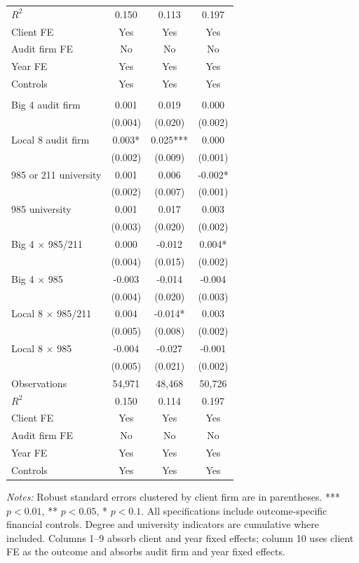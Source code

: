 \documentclass[10pt]{article}
\begin{document}
\begin{minipage}{19cm}
\begin{threeparttable}
\begin{tabular}{p{}ccc}
$R^{2}$ & 0.150 & 0.113 & 0.197 \\
Client FE & Yes & Yes & Yes \\
Audit firm FE & No & No & No \\
Year FE & Yes & Yes & Yes \\
Controls & Yes & Yes & Yes \\
\addlinespace
\multicolumn{4}{l}{\textbf{Panel B: Cumulative university tiers (base: neither 985 nor 211)}} \\
Big 4 audit firm & 0.001 & 0.019 & 0.000 \\
 & (0.004) & (0.020) & (0.002) \\
Local 8 audit firm & 0.003* & 0.025*** & 0.000 \\
 & (0.002) & (0.009) & (0.001) \\
985 or 211 university & 0.001 & 0.006 & -0.002* \\
 & (0.002) & (0.007) & (0.001) \\
985 university & 0.001 & 0.017 & 0.003 \\
 & (0.003) & (0.020) & (0.002) \\
Big 4 $\times$ 985/211 & 0.000 & -0.012 & 0.004* \\
 & (0.004) & (0.015) & (0.002) \\
Big 4 $\times$ 985 & -0.003 & -0.014 & -0.004 \\
 & (0.004) & (0.020) & (0.003) \\
Local 8 $\times$ 985/211 & 0.004 & -0.014* & 0.003 \\
 & (0.005) & (0.008) & (0.002) \\
Local 8 $\times$ 985 & -0.004 & -0.027 & -0.001 \\
 & (0.005) & (0.021) & (0.002) \\
Observations & 54,971 & 48,468 & 50,726 \\
$R^{2}$ & 0.150 & 0.114 & 0.197 \\
Client FE & Yes & Yes & Yes \\
Audit firm FE & No & No & No \\
Year FE & Yes & Yes & Yes \\
Controls & Yes & Yes & Yes \\
\bottomrule
\end{tabular}
\begin{tablenotes}\fontsize{9}{11}\selectfont
\item \raggedright \fontsize{9}{11}\selectfont \textit{Notes:} Robust standard errors clustered by client firm are in parentheses. *** $p<0.01$, ** $p<0.05$, * $p<0.1$. All specifications include outcome-specific financial controls. Degree and university indicators are cumulative where included.
Columns 1--9 absorb client and year fixed effects; column 10 uses client FE as the outcome and absorbs audit firm and year fixed effects.
\end{tablenotes}
\end{threeparttable}

\end{minipage}
\end{document}
